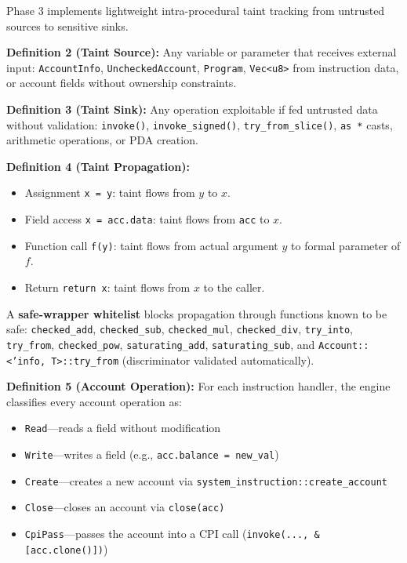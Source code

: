 \documentclass{article}
\begin{document}
Phase 3 implements lightweight intra-procedural taint tracking from untrusted sources to sensitive sinks.

\textbf{Definition 2 (Taint Source):} Any variable or parameter that receives external input: \texttt{AccountInfo}, \texttt{UncheckedAccount}, \texttt{Program}, \texttt{Vec<u8>} from instruction data, or account fields without ownership constraints.

\textbf{Definition 3 (Taint Sink):} Any operation exploitable if fed untrusted data without validation: \texttt{invoke()}, \texttt{invoke\_signed()}, \texttt{try\_from\_slice()}, \texttt{as *} casts, arithmetic operations, or PDA creation.

\textbf{Definition 4 (Taint Propagation):}
\begin{itemize}
  \item Assignment \texttt{x = y}: taint flows from $y$ to $x$.
  \item Field access \texttt{x = acc.data}: taint flows from \texttt{acc} to $x$.
  \item Function call \texttt{f(y)}: taint flows from actual argument $y$ to formal parameter of $f$.
  \item Return \texttt{return x}: taint flows from $x$ to the caller.
\end{itemize}

A \textbf{safe-wrapper whitelist} blocks propagation through functions known to be safe: \texttt{checked\_add}, \texttt{checked\_sub}, \texttt{checked\_mul}, \texttt{checked\_div}, \texttt{try\_into}, \texttt{try\_from}, \texttt{checked\_pow}, \texttt{saturating\_add}, \texttt{saturating\_sub}, and \texttt{Account::<'info, T>::try\_from} (discriminator validated automatically).

\textbf{Definition 5 (Account Operation):} For each instruction handler, the engine classifies every account operation as:
\begin{itemize}
  \item \texttt{Read}---reads a field without modification
  \item \texttt{Write}---writes a field (e.g., \texttt{acc.balance = new\_val})
  \item \texttt{Create}---creates a new account via \texttt{system\_instruction::create\_account}
  \item \texttt{Close}---closes an account via \texttt{close(acc)}
  \item \texttt{CpiPass}---passes the account into a CPI call (\texttt{invoke(..., \&[acc.clone()])})
\end{itemize}
\end{document}
